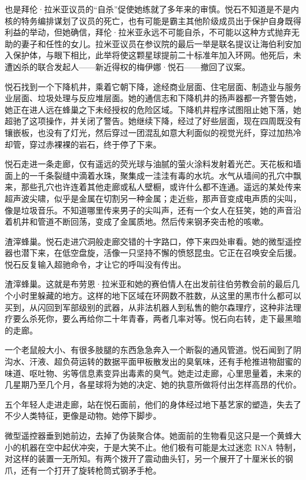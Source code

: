 \documentclass[AutoFakeBold=true]{book}
\begin{document}
也是拜伦·拉米亚议员的``自杀''促使她练就了多年来的审慎。悦石不知道是不是内核的特务编排谋划了议员的死亡，也有可能是霸主其他阶级成员出于保护自身既得利益的举动，但她确信，拜伦·拉米亚永远不可能自杀，不可能以这种方式抛弃无助的妻子和任性的女儿。拉米亚议员在参议院的最后一举是联名提议让海伯利安加入保护体，与眼下相比，此举将使这颗星球提前二十标准年加入环网。他死后，未遭凶杀的联合发起人——新近得权的梅伊娜·悦石——撤回了议案。

悦石找到一个下降机井，乘着它朝下降，途经商业层面、住宅层面、制造业与服务业层面、垃圾处理与反应堆层面。她的通信志和下降机井的扬声器都一齐警告她，她正在进人远在蜂巢之下未经授权的危险区域。下降机井程序试图阻止她下落，她超驰了这项操作，并关闭了警告。她继续下降，经过了好些层面，现在四周既没有镶嵌板，也没有了灯光，然后穿过一团混乱如意大利面似的视觉光纤，穿过加热冷却管，穿过赤裸裸的岩石，终于停了下来。

悦石走进一条走廊，仅有遥远的荧光球与油腻的萤火涂料发射着光芒。天花板和墙面上的一千条裂缝中滴着水珠，聚集成一洼洼有毒的水坑。水气从墙间的孔穴中飘来，那些孔穴也许连着其他走廊或私人壁橱，或许什么都不连通。遥远的某处传来超声波尖啸，似乎是金属在切割另一种金属；走近些，那声音变成电声质的尖叫，像是垃圾音乐。不知道哪里传来男子的尖叫声，还有一个女人在狂笑，她的声音沿着机井和管道不断回荡，变成了金属质地。然后传来钢矛突击枪的咳嗽。

渣滓蜂巢。悦石走进穴洞般走廊交错的十字路口，停下来四处审看。她的微型遥控器也潜下来，在低空盘旋，活像一只坚持不懈的愤怒昆虫。它正在召唤安全后援。悦石反复输入超驰命令，才让它的呼叫没有传出。

渣滓蜂巢。这就是布劳恩·拉米亚和她的赛伯情人在出发前往伯劳教会前的最后几个小时里躲藏的地方。这样的地下区域在环网数不胜数，从这里的黑市什么都可以买到，从闪回到军部级别的武器，从非法机器人到私售的鲍尔森理疗，这种非法理疗要么杀死你，要么再给你二十年青春，两者几率对等。悦石向右转，走下最黑暗的走廊。

一个老鼠般大小、有很多肢腿的东西急急奔入一个断裂的通风管道。悦石闻到了阴沟水、汗液、超负荷运转的数据平面甲板散发出的臭氧味，还有手枪推进物甜蜜的味道、呕吐物、劣等信息素变异出毒素的臭气。她走过走廊，心里思量着，未来的几星期乃至几个月，各星球将为她的决定、她的执意所做将付出怎样高昂的代价。

五个年轻人走进走廊，站在悦石面前，他们的身体经过地下基艺家的塑造，失去了不少人类特征，更像是动物。她停下脚步。

微型遥控器垂到她前边，去掉了伪装聚合体。她面前的生物看见这只是一个黄蜂大小的机器在空中起伏冲突，于是大笑不止。他们极有可能是太过迷恋 RNA 特制，对这样的装置一无所知。有两个拨开了震动曲头钉，另一个展开了十厘米长的钢爪，还有一个打开了旋转枪筒式钢矛手枪。
\end{document}
